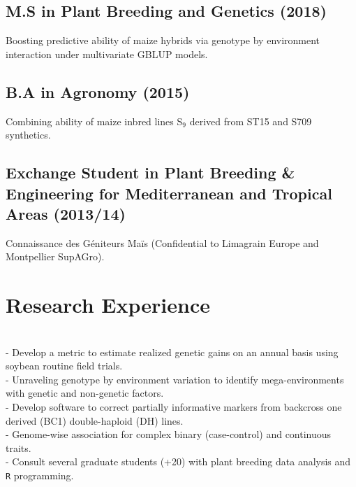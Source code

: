 \documentclass[]{mdkrause_cv_openfont}
\begin{document}
\begin{minipage}[t]{1\textwidth}
\subsection{M.S in Plant Breeding and Genetics (2018)}
 Boosting predictive ability of maize hybrids via genotype by environment interaction under multivariate GBLUP models.

\sectionsep
\vspace{0.2 mm}

\subsection{B.A in Agronomy (2015)}
 Combining ability of maize inbred lines S$_9$ derived from ST15 and S709 synthetics.

\sectionsep
\vspace{0.2 mm}

\subsection{Exchange Student in Plant Breeding \& Engineering for Mediterranean and Tropical Areas (2013/14)}
 Connaissance des Géniteurs Maïs (Confidential to Limagrain Europe and Montpellier SupAGro).

\sectionsep


\section{Research Experience}

\sectionsep

 \\
- Develop a metric to estimate realized genetic gains on an annual basis using soybean routine field trials. \\
- Unraveling genotype by environment variation to identify mega-environments with genetic and non-genetic factors. \\
- Develop software to correct partially informative markers from backcross one derived (BC1) double-haploid (DH) lines. \\
- Genome-wise association for complex binary (case-control) and continuous traits. \\
- Consult several graduate students (+20) with plant breeding data analysis and \texttt{R} programming. 


\end{minipage}
\end{document}
